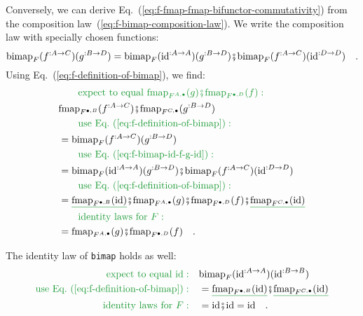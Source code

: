 Conversely, we can derive Eq.~(\ref{eq:f-fmap-fmap-bifunctor-commutativity})
from the composition law~(\ref{eq:f-bimap-composition-law}). We
write the composition law with specially chosen functions:
\begin{equation}
\text{bimap}_{F}(f^{:A\rightarrow C})(g^{:B\rightarrow D})=\text{bimap}_{F}(\text{id}^{:A\rightarrow A})(g^{:B\rightarrow D})\bef\text{bimap}_{F}(f^{:A\rightarrow C})(\text{id}^{:D\rightarrow D})\quad.\label{eq:f-bimap-id-f-g-id}
\end{equation}
Using Eq.~(\ref{eq:f-definition-of-bimap}), we find:
\begin{align*}
 & \quad{\color{greenunder}\quad\text{expect to equal }\text{fmap}_{F^{A,\bullet}}(g)\bef\text{fmap}_{F^{\bullet,D}}(f):}\quad\\
 & \text{fmap}_{F^{\bullet,B}}(f^{:A\rightarrow C})\bef\text{fmap}_{F^{C,\bullet}}(g^{:B\rightarrow D})\\
 & \quad{\color{greenunder}\quad\text{use Eq.~(\ref{eq:f-definition-of-bimap})}:}\quad\\
 & =\text{bimap}_{F}(f^{:A\rightarrow C})(g^{:B\rightarrow D})\\
 & \quad{\color{greenunder}\quad\text{use Eq.~(\ref{eq:f-bimap-id-f-g-id})}:}\quad\\
 & =\text{bimap}_{F}(\text{id}^{:A\rightarrow A})(g^{:B\rightarrow D})\bef\text{bimap}_{F}(f^{:A\rightarrow C})(\text{id}^{:D\rightarrow D})\\
 & \quad{\color{greenunder}\quad\text{use Eq.~(\ref{eq:f-definition-of-bimap})}:}\quad\\
 & =\gunderline{\text{fmap}_{F^{\bullet,B}}(\text{id})}\bef\text{fmap}_{F^{A,\bullet}}(g)\bef\text{fmap}_{F^{\bullet,D}}(f)\bef\gunderline{\text{fmap}_{F^{C,\bullet}}(\text{id})}\\
 & \quad{\color{greenunder}\quad\text{identity laws for }F:}\quad\\
 & =\text{fmap}_{F^{A,\bullet}}(g)\bef\text{fmap}_{F^{\bullet,D}}(f)\quad.
\end{align*}

The identity law of \lstinline!bimap! holds as well:
\begin{align*}
{\color{greenunder}\text{expect to equal }\text{id}:}\quad & \text{bimap}_{F}(\text{id}^{:A\rightarrow A})(\text{id}^{:B\rightarrow B})\\
{\color{greenunder}\text{use Eq.~(\ref{eq:f-definition-of-bimap})}:}\quad & =\gunderline{\text{fmap}_{F^{\bullet,B}}(\text{id})}\bef\gunderline{\text{fmap}_{F^{C,\bullet}}(\text{id})}\\
{\color{greenunder}\text{identity laws for }F:}\quad & =\text{id}\bef\text{id}=\text{id}\quad.
\end{align*}

